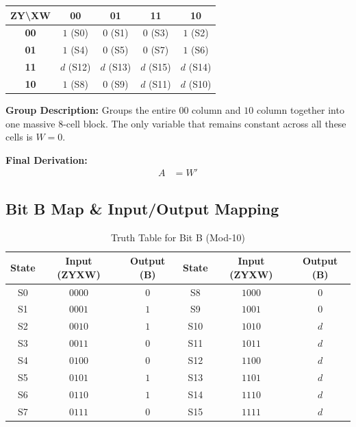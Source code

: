 \documentclass[journal,12pt,onecolumn]{IEEEtran}
\begin{document}
		\begin{table}[H]
			\centering
			\begin{tabular}{|c|c|c|c|c|}
				\hline
				\textbf{ZY\textbackslash XW} & \textbf{00} & \textbf{01} & \textbf{11} & \textbf{10} \\
				\hline
				\textbf{00} & \cellcolor{grpRed}$1$ (S0) & $0$ (S1) & $0$ (S3) & \cellcolor{grpRed}$1$ (S2) \\
				\hline
				\textbf{01} & \cellcolor{grpRed}$1$ (S4) & $0$ (S5) & $0$ (S7) & \cellcolor{grpRed}$1$ (S6) \\
				\hline
				\textbf{11} & \cellcolor{grpRed}$d$ (S12) & $d$ (S13) & $d$ (S15) & \cellcolor{grpRed}$d$ (S14) \\
				\hline
				\textbf{10} & \cellcolor{grpRed}$1$ (S8) & $0$ (S9) & \cellcolor{grpRed}$d$ (S11) & \cellcolor{grpRed}$d$ (S10) \\
				\hline
			\end{tabular}
		\end{table}
		
		\begin{justify}
			\textbf{Group Description:} Groups the entire $00$ column and $10$ column together into one massive 8-cell block. The only variable that remains constant across all these cells is $W=0$.
			
			\textbf{Final Derivation:}
			\begin{align}
				A &= W'
			\end{align}
		\end{justify}
		
		\vspace{1em}
		\subsection{Bit B Map \& Input/Output Mapping}
		
		\begin{table}[H]
			\centering
			\begin{tabular}{|c|c|c||c|c|c|}
				\hline
				\textbf{State} & \textbf{Input (ZYXW)} & \textbf{Output (B)} & \textbf{State} & \textbf{Input (ZYXW)} & \textbf{Output (B)} \\
				\hline
				S0 & $0000$ & $0$ & S8 & $1000$ & $0$ \\
				\hline
				S1 & $0001$ & $1$ & S9 & $1001$ & $0$ \\
				\hline
				S2 & $0010$ & $1$ & S10 & $1010$ & $d$ \\
				\hline
				S3 & $0011$ & $0$ & S11 & $1011$ & $d$ \\
				\hline
				S4 & $0100$ & $0$ & S12 & $1100$ & $d$ \\
				\hline
				S5 & $0101$ & $1$ & S13 & $1101$ & $d$ \\
				\hline
				S6 & $0110$ & $1$ & S14 & $1110$ & $d$ \\
				\hline
				S7 & $0111$ & $0$ & S15 & $1111$ & $d$ \\
				\hline
			\end{tabular}
			\caption{Truth Table for Bit B (Mod-10)}
		\end{table}
		
\end{document}
